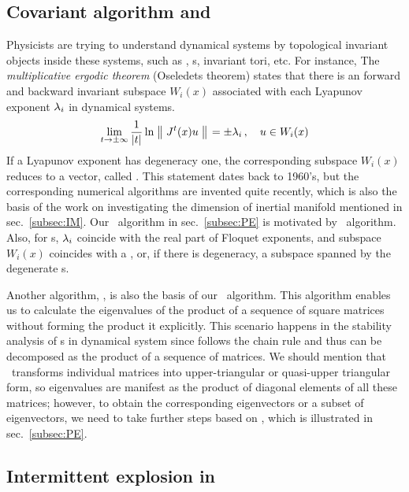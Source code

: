 \subsection{Covariant algorithm and \psd}
\label{subsec:CAPSD}
Physicists are trying to understand dynamical systems by
topological invariant objects inside these systems,
such as \eqva,
\po s, invariant tori, etc. For instance,
The \emph{multiplicative ergodic theorem} (Oseledets theorem)
states that
there is an forward and backward invariant subspace $W_i(x)$
associated with each Lyapunov exponent $\lambda_i$ in dynamical systems.
\begin{equation}
  \label{eq:lyapunov}
  \lim_{t\to\pm\infty}\frac{1}{|t|}\ln\left\Arrowvert \, J^t(x)u \, \right\Arrowvert
  = \pm\lambda_i
  \,,\quad  u\in W_i(x)
\end{equation}
If a Lyapunov exponent has degeneracy one, the corresponding
subspace $W_i(x)$ reduces to a vector, called \emph{\cLv}.
This statement dates back to 1960's, but the
corresponding numerical algorithms are invented quite recently, which
is also the basis of the work on investigating the dimension of inertial
manifold mentioned in sec.~\ref{subsec:IM}.
Our \Fv\ algorithm in sec.~\ref{subsec:PE} is motivated by
\cLv\ algorithm. Also,
for \po s, $\lambda_i$ coincide with the real part of Floquet exponents,
and subspace $W_i(x)$ coincides with
a \Fv, or, if there is degeneracy, a subspace
spanned by the degenerate \Fv s.

Another algorithm, \psd{},
is also the basis of our \Fv\
algorithm. This algorithm enables us to calculate the eigenvalues
of the product of a sequence of square matrices without forming the
product it explicitly. This scenario happens in the stability analysis
of \po s in dynamical system since {\monodromyM} follows
the chain rule and thus can be decomposed as the product of a sequence
of matrices. We should mention that \psd\ transforms individual
matrices into upper-triangular or quasi-upper triangular form,
so eigenvalues are manifest as the product of diagonal elements of all
these matrices; however, to obtain the corresponding eigenvectors or
a subset of eigenvectors, we need to take further steps based on
\psd, which is illustrated in sec.~\ref{subsec:PE}.

\subsection{Intermittent explosion in \cqcGLe}
\label{subsec:cqcgl}

